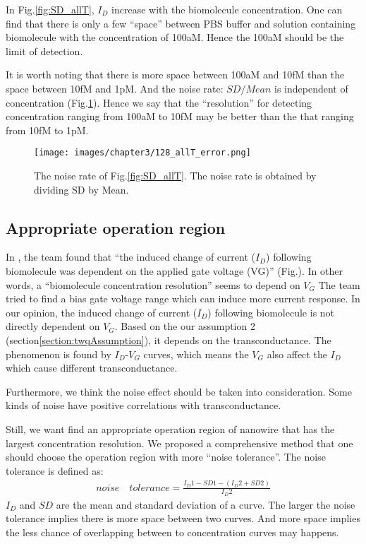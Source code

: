 In Fig.\ref{fig:SD_allT}, $I_D$ increase with the biomolecule concentration.
One can find that there is only a few ``space'' between PBS buffer and solution containing biomolecule with the concentration of 100aM.
Hence the 100aM should be the limit of detection.

It is worth noting that there is more space between 100aM and 10fM than the space between 10fM and 1pM.
And the noise rate: ${SD} / {Mean}$ is independent of concentration (Fig.\ref{fig:SD_allT2}).
Hence we say that the ``resolution'' for detecting concentration ranging from 100aM to 10fM may be better than the that ranging from 10fM to 1pM.
\begin{figure}[!htbp]
        \texttt{[image: images/chapter3/128\_allT\_error.png]}
    \caption{The noise rate of Fig.\ref{fig:SD_allT}. The noise rate is obtained by dividing SD by Mean.}
    \label{fig:SD_allT2}
\end{figure}

\subsection{Appropriate operation region} \label{section:biasVg}
In \cite{C6}, the team found that ``the induced change of current ($I_D$) following biomolecule was dependent on the applied gate voltage (VG)'' (Fig.).
In other words, a ``biomolecule concentration resolution'' seems to depend on $V_G$
The team tried to find a bias gate voltage range which can induce more current response.
In our opinion, the induced change of current ($I_D$) following biomolecule is not directly dependent on $V_G$.
Based on the our assumption 2 (section\ref{section:twqAssumption}), it depends on the transconductance.
The phenomenon is found by $I_D$-$V_G$ curves, which means the $V_G$ also affect the $I_D$ which cause different transconductance.

Furthermore, we think the noise effect should be taken into consideration.
Some kinds of noise have  positive correlations with transconductance.

Still, we want find an appropriate operation region of nanowire that has the largest concentration resolution.
We proposed a comprehensive method that one should choose the operation region with more ``noise tolerance''.
The noise tolerance is defined as:
\setlength{\mathindent}{2cm}
\begin{align}
    noise \quad tolerance = \frac{I_D1 - SD1 - (I_D2 + SD2)}{I_D2}
\end{align}
$I_D$ and $SD$ are the mean and standard deviation of a curve.
The larger the noise tolerance implies there is more space between two curves.
And more space implies the less chance of overlapping between to concentration curves may happens.

